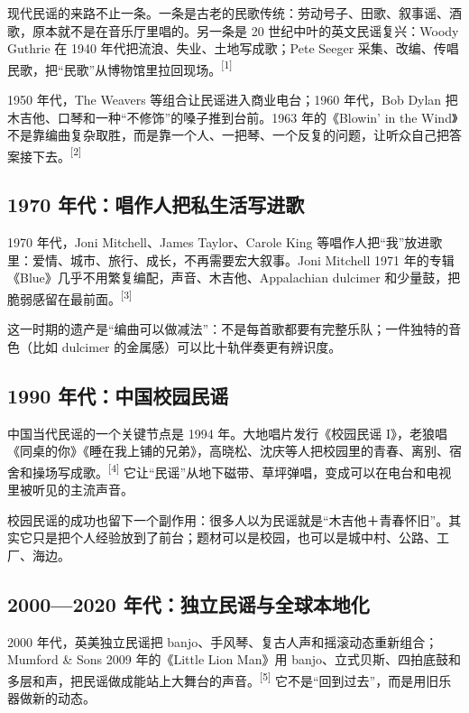 现代民谣的来路不止一条。一条是古老的民歌传统：劳动号子、田歌、叙事谣、酒歌，原本就不是在音乐厅里唱的。另一条是 20 世纪中叶的英文民谣复兴：Woody Guthrie 在 1940 年代把流浪、失业、土地写成歌；Pete Seeger 采集、改编、传唱民歌，把“民歌”从博物馆里拉回现场。{\textsuperscript{[1]}}

1950 年代，The Weavers 等组合让民谣进入商业电台；1960 年代，Bob Dylan 把木吉他、口琴和一种“不修饰”的嗓子推到台前。1963 年的《Blowin' in the Wind》不是靠编曲复杂取胜，而是靠一个人、一把琴、一个反复的问题，让听众自己把答案接下去。{\textsuperscript{[2]}}

\subsection{1970 年代：唱作人把私生活写进歌}
\label{sec:folk-history-1970s}

1970 年代，Joni Mitchell、James Taylor、Carole King 等唱作人把“我”放进歌里：爱情、城市、旅行、成长，不再需要宏大叙事。Joni Mitchell 1971 年的专辑《Blue》几乎不用繁复编配，声音、木吉他、Appalachian dulcimer 和少量鼓，把脆弱感留在最前面。{\textsuperscript{[3]}}

这一时期的遗产是“编曲可以做减法”：不是每首歌都要有完整乐队；一件独特的音色（比如 dulcimer 的金属感）可以比十轨伴奏更有辨识度。

\subsection{1990 年代：中国校园民谣}
\label{sec:folk-history-china-1990s}

中国当代民谣的一个关键节点是 1994 年。大地唱片发行《校园民谣 I》，老狼唱《同桌的你》《睡在我上铺的兄弟》，高晓松、沈庆等人把校园里的青春、离别、宿舍和操场写成歌。{\textsuperscript{[4]}} 它让“民谣”从地下磁带、草坪弹唱，变成可以在电台和电视里被听见的主流声音。

校园民谣的成功也留下一个副作用：很多人以为民谣就是“木吉他＋青春怀旧”。其实它只是把个人经验放到了前台；题材可以是校园，也可以是城中村、公路、工厂、海边。

\subsection{2000—2020 年代：独立民谣与全球本地化}
\label{sec:folk-history-2000s}

2000 年代，英美独立民谣把 banjo、手风琴、复古人声和摇滚动态重新组合；Mumford \& Sons 2009 年的《Little Lion Man》用 banjo、立式贝斯、四拍底鼓和多层和声，把民谣做成能站上大舞台的声音。{\textsuperscript{[5]}} 它不是“回到过去”，而是用旧乐器做新的动态。

